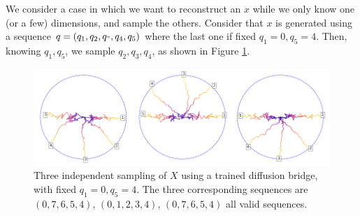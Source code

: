 \documentclass[nohyperref]{article}
\theoremstyle{plain}
\theoremstyle{definition}
\theoremstyle{remark}
\begin{document}
\label{ap:toyinpainting}
We consider a case in which we want to reconstruct an $x$ while we only know one (or a few) dimensions, and sample the others. Consider that $x$ is generated using a sequence $q= (q_1,q_2,q_",q_4,q_5)$ where the last one if fixed $q_1 = 0, q_5 = 4$. Then, knowing $q_1, q_5$, we sample $q_2,q_3,q_4$, as shown in Figure \ref{fig:fixeddim}.
\begin{figure}[h!]
    \centering
    \includegraphics[scale=0.5]{images/samplesFixed.png}
    \caption{Three independent sampling of $X$ using a trained diffusion bridge, with fixed $q_1 = 0, q_5 = 4$. The three corresponding sequences are $(0,7,6,5,4)$, $(0,1,2,3,4)$, $(0,7,6,5,4)$ all valid sequences.}
    \label{fig:fixeddim}
\end{figure}

 


\end{document}
